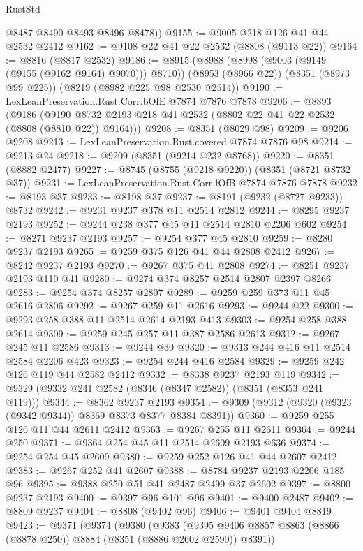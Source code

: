 \begin{lexlean}{RustStd}
\begin{coremodule}
{\begin{coremodule}
{{{{{{{{{{{{{{{{{{{{{{{{{{{{{{{{{{{{{{{{{{{{{{{{{{        @8487
        @8490
        @8493
        @8496
        @8478))
@9155 := @9005 @218 @126 @41 @44 @2532 @2412
@9162 := @9108 @22 @41 @22 @2532 (@8808 (@9113 @22))
@9164 := @8816 (@8817 @2532)
@9186 := @8915
    (@8988 (@8998 (@9003 (@9149 (@9155 (@9162 @9164) @9070))) @8710))
    (@8953 (@8966 @22))
    (@8351 (@8973 @99 @225))
    (@8219 (@8982 @225 @98 @2530 @2514))
@9190 := LexLeanPreservation.Rust.Corr.bOfE @7874 @7876 @7878
@9206 := @8893
    (@9186 (@9190 @8732 @2193 @218 @41 @2532 (@8802 @22 @41 @22 @2532 (@8808 (@8810 @22)) @9164)))
@9208 := @8351 (@8029 @98)
@9209 := @9206 @9208
@9213 := LexLeanPreservation.Rust.covered @7874 @7876 @98
@9214 := @9213 @24
@9218 := @9209 (@8351 (@9214 @232 @8768))
@9220 := @8351 (@8882 @2477)
@9227 := @8745 (@8755 (@9218 @9220)) (@8351 (@8721 @8732 @37))
@9231 := LexLeanPreservation.Rust.Corr.fOfB @7874 @7876 @7878
@9232 := @8193 @37
@9233 := @8198 @37
@9237 := @8191 (@9232 (@8727 @9233)) @8732
@9242 := @9231 @9237 @378 @11 @2514 @2812
@9244 := @8295 @9237 @2193
@9252 := @9244 @238 @377 @45 @11 @2514 @2810 @2206 @602
@9254 := @8271 @9237 @2193
@9257 := @9254 @377 @45 @2810
@9259 := @8280 @9237 @2193
@9265 := @9259 @375 @126 @41 @44 @2808 @2412
@9267 := @8242 @9237 @2193
@9270 := @9267 @375 @41 @2808
@9274 := @8251 @9237 @2193 @110 @41
@9280 := @9274 @374 @8257 @2514 @2807 @2397 @8266
@9283 := @9254 @374 @8257 @2807
@9289 := @9259 @259 @373 @11 @45 @2616 @2806
@9292 := @9267 @259 @11 @2616
@9293 := @9244 @22
@9300 := @9293 @258 @388 @11 @2514 @2614 @2193 @413
@9303 := @9254 @258 @388 @2614
@9309 := @9259 @245 @257 @11 @387 @2586 @2613
@9312 := @9267 @245 @11 @2586
@9313 := @9244 @30
@9320 := @9313 @244 @416 @11 @2514 @2584 @2206 @423
@9323 := @9254 @244 @416 @2584
@9329 := @9259 @242 @126 @119 @44 @2582 @2412
@9332 := @8338 @9237 @2193 @119
@9342 := @9329 (@9332 @241 @2582 (@8346 (@8347 @2582)) (@8351 (@8353 @241 @119)))
@9344 := @8362 @9237 @2193
@9354 := @9309 (@9312 (@9320 (@9323 (@9342 @9344)) @8369 @8373 @8377 @8384 @8391))
@9360 := @9259 @255 @126 @11 @44 @2611 @2412
@9363 := @9267 @255 @11 @2611
@9364 := @9244 @250
@9371 := @9364 @254 @45 @11 @2514 @2609 @2193 @636
@9374 := @9254 @254 @45 @2609
@9380 := @9259 @252 @126 @41 @44 @2607 @2412
@9383 := @9267 @252 @41 @2607
@9388 := @8784 @9237 @2193 @2206 @185 @96
@9395 := @9388 @250 @51 @41 @2487 @2499 @37 @2602
@9397 := @8800 @9237 @2193
@9400 := @9397 @96 @101 @96
@9401 := @9400 @2487
@9402 := @8809 @9237
@9404 := @8808 (@9402 @96)
@9406 := @9401 @9404 @8819
@9423 := @9371
    (@9374
      (@9380
        (@9383
          (@9395 @9406 @8857 @8863 (@8866 (@8878 @250)) @8884 (@8351 (@8886 @2602 @2590)) @8391))
}}}}}}}}}}}}}}}}}}}}}}}}}}}}}}}}}}}}}}}}}}}}}}}}}}
\end{coremodule}}
\end{coremodule}
\end{lexlean}
